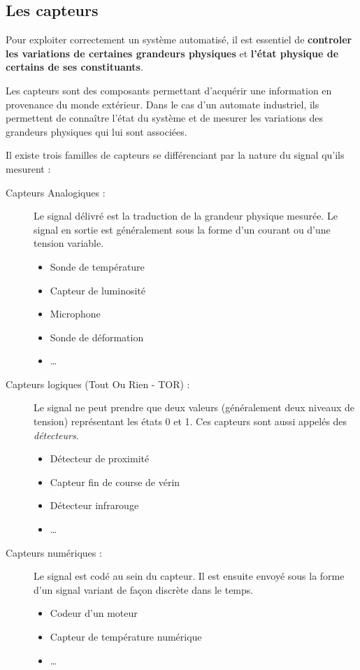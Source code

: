 \subsection{Les capteurs}
Pour exploiter correctement un système automatisé, il est essentiel de \textbf{controler les variations de certaines grandeurs physiques} et \textbf{l'état physique de certains de ses constituants}.

Les capteurs sont des composants permettant d'acquérir une information en provenance du monde extérieur. Dans le cas d'un automate industriel, ils permettent de connaître l'état du système et de mesurer les variations des grandeurs physiques qui lui sont associées.



Il existe trois familles de capteurs se différenciant par la nature du signal qu'ils mesurent :

\begin{description}
	\item [Capteurs Analogiques : ] Le signal délivré est la traduction de la grandeur physique mesurée. Le signal en sortie est généralement sous la forme d'un courant ou d'une tension variable.

	\begin{itemize}
		\item Sonde de température
		\item Capteur de luminosité
		\item Microphone
		\item Sonde de déformation
		\item \dots
	\end{itemize}

	\item [Capteurs logiques (Tout Ou Rien - TOR) : ] Le signal ne peut prendre que deux valeurs (généralement deux niveaux de tension) représentant les états 0 et 1. Ces capteurs sont aussi appelés des \textit{détecteurs}.
		\begin{itemize}
			\item Détecteur de proximité
			\item Capteur fin de course de vérin
			\item Détecteur infrarouge
			\item \dots
		\end{itemize}

			\item[Capteurs numériques :] Le signal est codé au sein du capteur. Il est ensuite envoyé sous la forme d'un signal variant de façon discrète dans le temps.
			\begin{itemize}
				\item Codeur d'un moteur
				\item Capteur de température numérique
				\item \dots
			\end{itemize}
\end{description}

